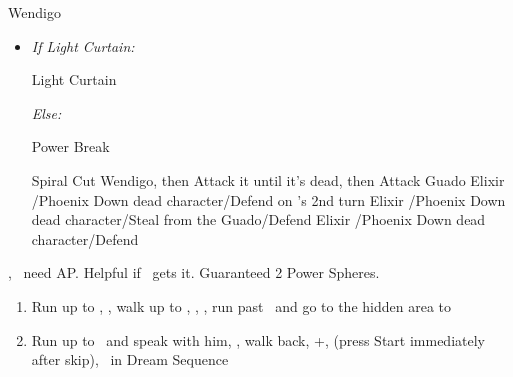 \winvfill
\bothvfill
\begin{battle}[18000]{Wendigo}
	\begin{itemize}
		\tidusf Haste \tidus
		\tidusf Switch Weapon to Brotherhood
		\tidusf Attack Guado B (Top One)
		\item \textit{If Light Curtain:}
			\begin{itemize}
				\rikkuf Light Curtain \tidus
			\end{itemize}
		\textit{Else:}
			\begin{itemize}
				\switch{\rikku}{\auron}
				\auronf Power Break
			\end{itemize}
		\tidusf Spiral Cut Wendigo, then Attack it until it's dead, then Attack Guado
		\yunaf Elixir \tidus/Phoenix Down dead character/Defend
		\switch{\yuna}{\lulu} on \yuna's 2nd turn
		\rikkuf Elixir \tidus/Phoenix Down dead character/Steal from the Guado/Defend
		\luluf Elixir \tidus/Phoenix Down dead character/Defend
	\end{itemize}
	\yuna, \tidus\ need AP. Helpful if \lulu\ gets it.
	Guaranteed 2 Power Spheres.
\end{battle}
\begin{enumerate}[resume]
	\item Run up to \rikku, \sd, walk up to \yuna, \sd, \save, run past \kimahri\ and go to the hidden area to 
	\winvfill
	\item Run up to \auron\ and speak with him, \sd, walk back, \cs+\skippablefmv[1:00], (press Start immediately after skip), \sd\ in Dream Sequence
\end{enumerate}